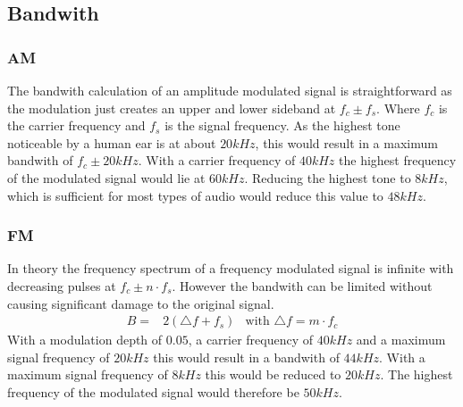 \subsection{Bandwith}

\subsubsection*{AM}

The bandwith calculation of an amplitude modulated signal is straightforward as the modulation just creates an upper and lower sideband at $f_c \pm f_s$.\cite{netzberger_kommunikationstechnologie_2021-1} Where $f_c$ is the carrier frequency and $f_s$ is the signal frequency.\p
As the highest tone noticeable by a human ear is at about $20kHz$, this would result in a maximum bandwith of $f_c \pm 20kHz$. With a carrier frequency of $40kHz$ the highest frequency of the modulated signal would lie at $60kHz$. Reducing the highest tone to $8kHz$, which is sufficient for most types of audio would reduce this value to $48kHz$.

\subsubsection*{FM}

In theory the frequency spectrum of a frequency modulated signal is infinite with decreasing pulses at $f_c \pm n \cdot f_s$. However the bandwith can be limited without causing significant damage to the original signal.\cite{netzberger_kommunikationstechnologie_2021-1}
%
\begin{align}
  B =& 2 (\triangle f + f_s) &\textrm{with~} \triangle f = m \cdot f_c
\end{align}
%
With a modulation depth of $0.05$, a carrier frequency of $40kHz$ and a maximum signal frequency of $20kHz$ this would result in a bandwith of $44kHz$. With a maximum signal frequency of $8kHz$ this would be reduced to $20kHz$. The highest frequency of the modulated signal would therefore be $50kHz$.